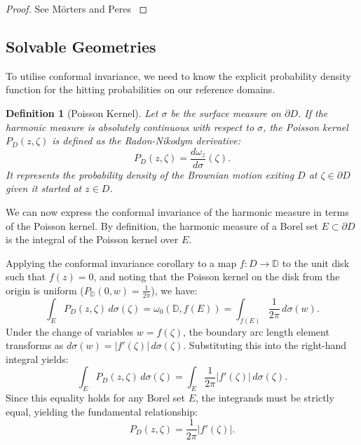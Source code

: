 \documentclass[12pt, a4paper, oneside]{report}
\newtheorem{definition}[theorem]{Definition}
\theoremstyle{remark}
\begin{document}
\begin{proof}
See M{\"o}rters and Peres \cite[Theorem 7.23(a)]{Morters2010}
\end{proof}

\subsection{Solvable Geometries}
\label{sec:solvable_geometries}

To utilise conformal invariance, we need to know the explicit probability density function for the hitting probabilities on our reference domains.

\begin{definition}[Poisson Kernel]
Let $\sigma$ be the surface measure on $\partial D$. If the harmonic measure is absolutely continuous with respect to $\sigma$, the Poisson kernel $P_D(z, \zeta)$ is defined as the Radon-Nikodym derivative:
\begin{equation*}
    P_D(z, \zeta) = \frac{d\omega_z}{d\sigma}(\zeta).
\end{equation*}
It represents the probability density of the Brownian motion exiting $D$ at $\zeta \in \partial D$ given it started at $z \in D$.
\end{definition}

We can now express the conformal invariance of the harmonic measure in terms of the Poisson kernel. By definition, the harmonic measure of a Borel set $E \subset \partial D$ is the integral of the Poisson kernel over $E$. 

Applying the conformal invariance corollary to a map $f: D \to \mathbb{D}$ to the unit disk such that $f(z)=0$, and noting that the Poisson kernel on the disk from the origin is uniform ($P_{\mathbb{D}}(0, w) = \frac{1}{2\pi}$), we have:
\begin{equation*}
    \int_E P_D(z, \zeta) \, d\sigma(\zeta) = \omega_0(\mathbb{D}, f(E)) = \int_{f(E)} \frac{1}{2\pi} \, d\sigma(w).
\end{equation*}
Under the change of variables $w = f(\zeta)$, the boundary arc length element transforms as $d\sigma(w) = |f'(\zeta)| \, d\sigma(\zeta)$. Substituting this into the right-hand integral yields:
\begin{equation*}
    \int_E P_D(z, \zeta) \, d\sigma(\zeta) = \int_E \frac{1}{2\pi} |f'(\zeta)| \, d\sigma(\zeta).
\end{equation*}
Since this equality holds for any Borel set $E$, the integrands must be strictly equal, yielding the fundamental relationship:
\begin{equation} \label{eq:poisson_kernel}
    P_D(z, \zeta) = \frac{1}{2\pi} |f'(\zeta)|.
\end{equation}
\end{document}
